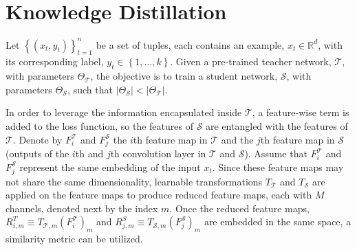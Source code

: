 \documentclass{article}
\begin{document}
\section{Knowledge Distillation}
Let $\left\{\left(x_t,y_t\right) \right\}_{t=1}^n$ be a set of tuples, each contains an example, $x_t\in\mathbb{R}^d$, with its corresponding label, $y_t\in\left\{1,\dots,k\right\}$. Given a pre-trained teacher network, $\mathcal{T}$, with parameters $\Theta_\mathcal{T}$, the objective is to train a student network, $\mathcal{S}$, with parameters $\Theta_\mathcal{S}$, such that $\vert \Theta_\mathcal{S} \vert < \vert \Theta_\mathcal{T} \vert$.

In order to leverage the information encapsulated inside $\mathcal{T}$, a feature-wise term is added to the loss function, so the features of $\mathcal{S}$ are entangled with the features of $\mathcal{T}$. Denote by $F^{\mathcal{T}}_i$ and $F^{\mathcal{S}}_j$ the $i$th feature map in $\mathcal{T}$ and the $j$th feature map in $\mathcal{S}$ (outputs of the $i$th and $j$th convolution layer in $\mathcal{T}$ and $\mathcal{S}$). Assume that $F^{\mathcal{T}}_i$ and $F^{\mathcal{S}}_j$ represent the same embedding of the input $x_t$. Since these feature maps may not share the same dimensionality, learnable transformations $T_{\mathcal{T}}$ and $T_{\mathcal{S}}$ are applied on the feature maps to produce reduced feature maps, each with $M$ channels, denoted next by the index $m$. Once the reduced feature maps, $R^T_{i,m} \equiv T_{\mathcal{T},m}\left(F^{\mathcal{T}}_i \right)_m$ and $R^S_{j,m} \equiv T_{\mathcal{S},m}\left(F^{\mathcal{S}}_j \right)_m$ are embedded in the same space, a similarity metric can be utilized.
\end{document}
